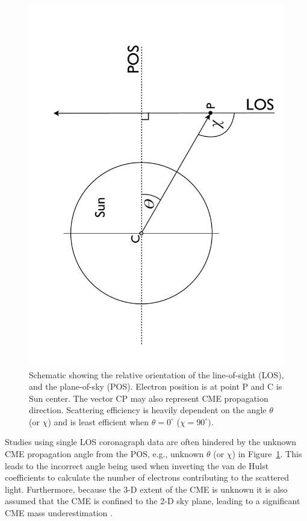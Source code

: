 \begin{figure}[h!]
\includegraphics[trim = 0cm 0cm 0cm 0cm, scale=0.3, angle=270]{images/LOS_POS_2.pdf}
\caption[Line-of-sight and plane-of-sky orientations]{Schematic showing the relative orientation of the line-of-sight (LOS), and the plane-of-sky (POS). Electron position is at point P and C is 
Sun center. The vector CP may also represent CME propagation direction. Scattering efficiency is heavily dependent on the angle $\theta$ 
(or $\chi$) and is least efficient 
when $\theta = 0^{\circ}$ ($\chi=90^{\circ})$.}
\label{fig:LOS_POS_2}
\end{figure}

Studies using single LOS coronagraph data are often hindered by the unknown CME propagation angle from the POS, e.g., unknown $\theta$ (or $\chi$) in 
Figure~\ref{fig:LOS_POS_2}. This leads to the incorrect angle being used when inverting the van de Hulst coefficients to calculate the number of electrons 
contributing to the scattered light. 
Furthermore, because the 3-D extent of the CME is unknown it is also assumed that the CME is confined to the 2-D sky plane, leading to a significant CME 
mass underestimation \citep{vou00}.

